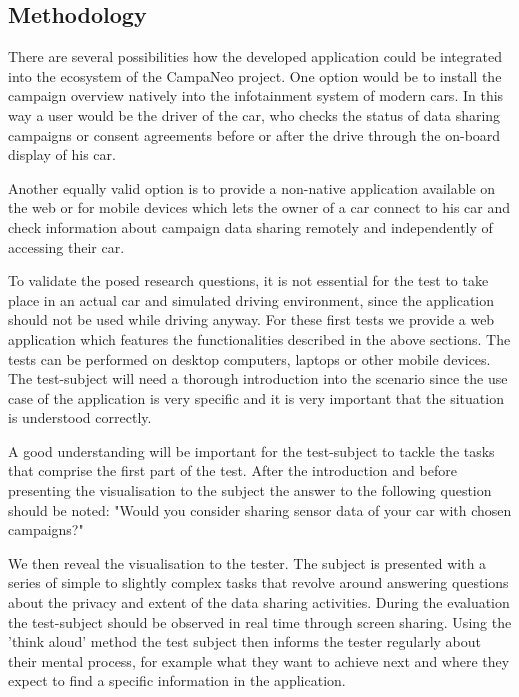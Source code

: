 
  \subsection{Methodology}
  There are several possibilities how the developed application could be integrated into the ecosystem of the CampaNeo project. One option would be to install the campaign overview natively into the infotainment system of modern cars.
  In this way a user would be the driver of the car, who checks the status of data sharing campaigns or consent agreements before or after the drive through the on-board display of his car.

  Another equally valid option is to provide a non-native application available on the web or for mobile devices which lets the owner of a car connect to his car and check information about campaign data sharing remotely and independently of accessing their car.

  To validate the posed research questions, it is not essential for the test to take place in an actual car and simulated driving environment, since the application should not be used while driving anyway. For these first tests we provide a web application which features the functionalities described in the above sections. The tests can be performed on desktop computers, laptops or other mobile devices.
  The test-subject will need a thorough introduction into the scenario since the use case of the application is very specific and it is very important that the situation is understood correctly.

  A good understanding will be important for the test-subject to tackle the tasks that comprise the first part of the test.
  After the introduction and before presenting the visualisation to the subject the answer to the following question should be noted: "Would you consider sharing sensor data of your car with chosen campaigns?"

  We then reveal the visualisation to the tester. The subject is presented with a series of simple to slightly complex tasks that revolve around answering questions about the privacy and extent of the data sharing activities.
  During the evaluation the test-subject should be observed in real time through screen sharing.
  Using the 'think aloud' method the test subject then informs the tester regularly about their mental process, for example what they want to achieve next and where they expect to find a specific information in the application.

